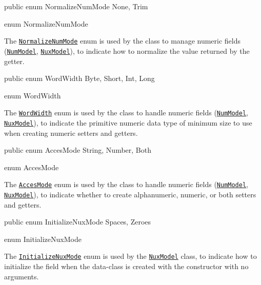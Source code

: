 \documentclass[a4paper,10pt]{report}
\newenvironment{elisting}[1][H]
  {\captionsetup{aboveskip=0pt}\begin{listing}[#1]}
  {\end{listing}%
}
\begin{document}
\begin{elisting}
\begin{javacode}
public enum NormalizeNumMode { None, Trim }
\end{javacode}
\caption{enum NormalizeNumMode}\label{lst:NormalizeNumMode}
\end{elisting}
The \hyperref[lst:NormalizeNumMode]{\texttt{NormalizeNumMode}} enum is used by 
the class to manage numeric fields (\hyperref[lst:NumModel]{\texttt{NumModel}},
\hyperref[lst:NuxModel]{\texttt{NuxModel}}), to indicate how to normalize the 
value returned by the getter.

\begin{elisting}
\begin{javacode}
public enum WordWidth { Byte, Short, Int, Long }
\end{javacode}
\caption{enum WordWidth}\label{lst:WordWidth}
\end{elisting}
The \hyperref[lst:WordWidth]{\texttt{WordWidth}} enum is used by the class to 
handle numeric fields (\hyperref[lst:NumModel]{\texttt{NumModel}},
\hyperref[lst:NuxModel]{\texttt{NuxModel}}), to indicate the primitive numeric 
data type of minimum size to use when creating numeric setters and getters.

\begin{elisting}
\begin{javacode}
public enum AccesMode { String, Number, Both }
\end{javacode}
\caption{enum AccesMode}\label{lst:AccesMode}
\end{elisting}
The \hyperref[lst:AccesMode]{\texttt{AccesMode}} enum is used by the class to 
handle numeric fields (\hyperref[lst:NumModel]{\texttt{NumModel}},
\hyperref[lst:NuxModel]{\texttt{NuxModel}}), to indicate whether to create 
alphanumeric, numeric, or both setters and getters.

\begin{elisting}
\begin{javacode}
public enum InitializeNuxMode { Spaces, Zeroes }
\end{javacode}
\caption{enum InitializeNuxMode}\label{lst:InitializeNuxMode}
\end{elisting}
The \hyperref[lst:InitializeNuxMode]{\texttt{InitializeNuxMode}} enum is used 
by the \hyperref[lst:NuxModel]{\texttt{NuxModel}} class, to indicate how to 
initialize the field when the data-class is created with the constructor with 
no arguments.
\end{document}

